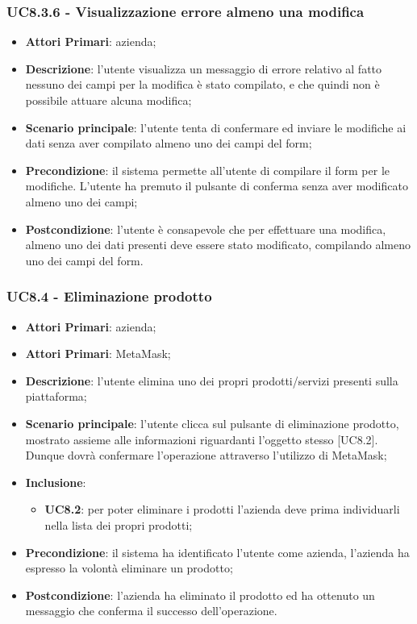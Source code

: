 \subsubsection{UC8.3.6 - Visualizzazione errore almeno una modifica}
\begin{itemize}
	\item \textbf{Attori Primari}: azienda;
	\item \textbf{Descrizione}:
	l'utente visualizza un messaggio di errore relativo al fatto nessuno dei campi per la modifica è stato compilato, e che quindi non è possibile attuare alcuna modifica;
	\item \textbf{Scenario principale}: l'utente tenta di confermare ed inviare le modifiche ai dati senza aver compilato almeno uno dei campi del form;
	\item \textbf{Precondizione}: il sistema permette all'utente di compilare il form per le modifiche. L'utente ha premuto il pulsante di conferma senza aver modificato almeno uno dei campi; 
	\item \textbf{Postcondizione}:
	l'utente è consapevole che per effettuare una modifica, almeno uno dei dati presenti deve essere stato modificato, compilando almeno uno dei campi del form.
\end{itemize}

\subsubsection{UC8.4 - Eliminazione prodotto}
\begin{itemize}
	\item \textbf{Attori Primari}: azienda;
	\item \textbf{Attori Primari}: MetaMask\glo;
	\item \textbf{Descrizione}:
	l'utente elimina uno dei propri prodotti/servizi presenti sulla piattaforma;
	\item \textbf{Scenario principale}: l'utente clicca sul pulsante di eliminazione prodotto, mostrato assieme alle informazioni riguardanti l'oggetto stesso [UC8.2]. Dunque dovrà confermare l'operazione attraverso l'utilizzo di MetaMask\glo;
	\item \textbf{Inclusione}:
	\begin{itemize}
		\item \textbf{UC8.2}: per poter eliminare i prodotti l'azienda deve prima individuarli nella lista dei propri prodotti;
	\end{itemize}
	\item \textbf{Precondizione}: il sistema ha identificato l'utente come azienda, l'azienda ha espresso la volontà eliminare un prodotto;
	\item \textbf{Postcondizione}: l'azienda ha eliminato il prodotto ed ha ottenuto un messaggio che conferma il successo dell'operazione.
\end{itemize}


